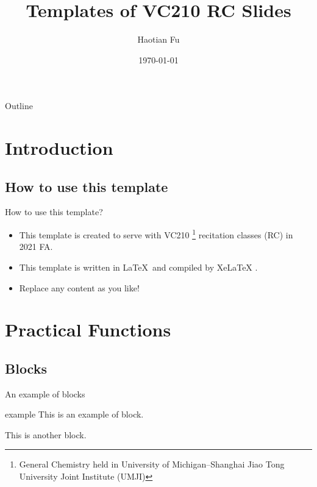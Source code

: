 \documentclass[12pt,compress]{beamer}
\title{Templates of VC210 RC Slides}
\author{Haotian Fu}
\institute{University of Michigan--Shanghai Jiao Tong University Joint Institute}
\date{\today}
\begin{document}


\frame{\titlepage}

\section[Outline]{}
\begin{frame}{Outline}
  \tableofcontents
\end{frame}


\section{Introduction}
\subsection{How to use this template}
\begin{frame}{How to use this template?}
  \begin{itemize}
    \item This template is created to serve with VC210 \footnote{\tiny{General Chemistry held in University of Michigan--Shanghai Jiao Tong University Joint Institute (UMJI)}} recitation classes (RC) in 2021 FA.
    \item This template is written in \LaTeX\ and compiled by XeLaTeX .
    \item Replace any content as you like!
  \end{itemize}
\end{frame}


\section{Practical Functions}

\subsection{Blocks}
\begin{frame}{An example of blocks}
    \begin{block}{example}
        This is an example of block.
    \end{block}
    \begin{block}{}
        This is another block.
    \end{block}
\end{frame}
\end{document}
